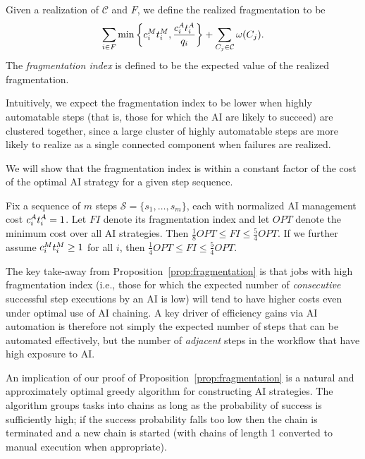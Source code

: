 Given a realization of $\mathcal{C}$ and $F$, we define the realized fragmentation to be
\begin{equation}
    \sum_{i \in F}\min\left\{c^{M}_{i}t^{M}_{i}, \frac{c^{A}_{i}t^{A}_{i}}{q_i}\right\} + \sum_{C_j \in \mathcal{C}} \omega(C_j).\label{eq:fragmentation}
\end{equation}
The \emph{fragmentation index} is defined to be the expected value of the realized fragmentation.

Intuitively, we expect the fragmentation index to be lower when highly automatable steps (that is, those for which the AI are likely to succeed) are clustered together, since a large cluster of highly automatable steps are more likely to realize as a single connected component when failures are realized.

We will show that the fragmentation index is within a constant factor of the cost of the optimal AI strategy for a given step sequence.

\begin{proposition}
\label{prop:fragmentation}
   Fix a sequence of $m$ steps $\mathcal{S} = \{s_1, \dotsc, s_m\}$, each with normalized AI management cost $c^{A}_{i}t^{A}_{i} = 1$.
   Let $FI$ denote its fragmentation index and let $OPT$ denote the minimum cost over all AI strategies.
   Then $\tfrac{1}{8}OPT \leq FI \leq \tfrac{5}{4}OPT$.
   If we further assume $c^{M}_{i}t^{M}_{i} \geq 1$ for all $i$, then $\tfrac{1}{4}OPT \leq FI \leq \tfrac{5}{4}OPT$.
\end{proposition}

The key take-away from Proposition~\ref{prop:fragmentation} is that jobs with high fragmentation index (i.e., those for which the expected number of \emph{consecutive} successful step executions by an AI is low) will tend to have higher costs even under optimal use of AI chaining.
A key driver of efficiency gains via AI automation is therefore not simply the expected number of steps that can be automated effectively, but the number of \emph{adjacent} steps in the workflow that have high exposure to AI.

An implication of our proof of Proposition~\ref{prop:fragmentation} is a natural and approximately optimal greedy algorithm for constructing AI strategies.
The algorithm groups tasks into chains as long as the probability of success is sufficiently high; if the success probability falls too low then the chain is terminated and a new chain is started (with chains of length 1 converted to manual execution when appropriate).



